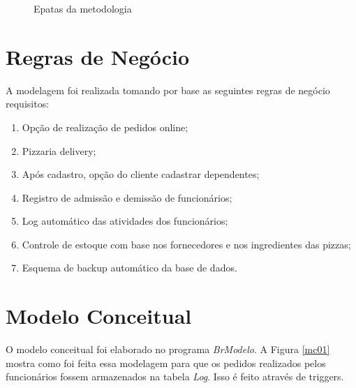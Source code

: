 \documentclass[
	12pt,				%
	openright,			%
	oneside,			%
	a4paper,			%
	chapter=TITLE,		%
	section=TITLE,		%
	english,			%
	brazil				%
	]{abntex2}
\begin{document}
\begin{figure}[h]
    \caption{Epatas da metodologia}
    \centering


    \label{figuramet}
\end{figure}

\chapter {Regras de Negócio}

A modelagem foi realizada tomando por base as seguintes regras de negócio
    requisitos:
    \begin {enumerate}
        \item Opção de realização de pedidos online;
        \item Pizzaria delivery;
        \item Após cadastro, opção do cliente cadastrar dependentes;
        \item Registro de admissão e demissão de funcionários;
        \item Log automático das atividades dos funcionários;
        \item Controle de estoque com base nos fornecedores e nos ingredientes das pizzas;
        \item Esquema de backup automático da base de dados.
    \end {enumerate}

\chapter{Modelo Conceitual}
    O modelo conceitual foi elaborado no programa \textit{BrModelo}. A Figura \ref{mc01} 
    mostra como foi feita essa modelagem para que os pedidos realizados pelos funcionários fossem 
    armazenados na tabela \textit{Log}. Isso é feito através de triggers.
    
\end{document}

